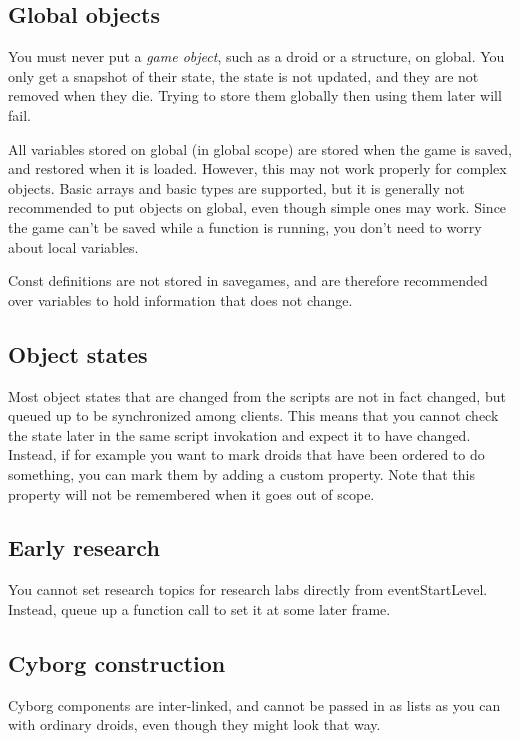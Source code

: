 \documentclass[12pt]{article}
\begin{document}
\subsection{Global objects}
You must never put a \emph{game object}, such as a droid or a structure, on global. You only get a snapshot of their state,
the state is not updated, and they are not removed when they die. Trying to store them globally then using them 
later will fail.

All variables stored on global (in global scope) are stored when the game is saved, and restored when it is 
loaded. However, this may not work properly for complex objects. Basic arrays and basic types are supported,
but it is generally not recommended to put objects on global, even though simple ones may work. Since the game
can't be saved while a function is running, you don't need to worry about local variables.

Const definitions are not stored in savegames, and are therefore recommended over variables to hold information 
that does not change.

\subsection{Object states}
Most object states that are changed from the scripts are not in fact changed, but queued up to be synchronized
among clients. This means that you cannot check the state later in the same script invokation and expect it to
have changed. Instead, if for example you want to mark droids that have been ordered to do something, you can
mark them by adding a custom property. Note that this property will not be remembered when it goes out of scope.

\subsection{Early research}
You cannot set research topics for research labs directly from eventStartLevel. Instead, queue up a function
call to set it at some later frame.

\subsection{Cyborg construction}
Cyborg components are inter-linked, and cannot be passed in as lists as you can with ordinary droids, even
though they might look that way.
\end{document}
